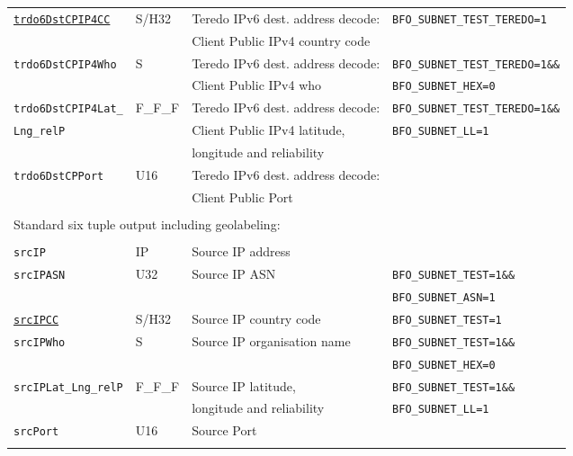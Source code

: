 \documentclass[documentation]{subfiles}
\begin{document}
\begin{longtable}{llll}
    {\tt \hyperref[subnet]{trdo6DstCPIP4CC}}  & S/H32   & Teredo IPv6 dest. address decode:       & {\tt\small BFO\_SUBNET\_TEST\_TEREDO=1}\\
                                              &         & \qquad Client Public IPv4 country code  & \\
    {\tt trdo6DstCPIP4Who}                    & S       & Teredo IPv6 dest. address decode:       & {\tt\small BFO\_SUBNET\_TEST\_TEREDO=1\&\&}\\
                                              &         & \qquad Client Public IPv4 who           & {\tt\small BFO\_SUBNET\_HEX=0}\\
    {\tt trdo6DstCPIP4Lat\_}                  & F\_F\_F & Teredo IPv6 dest. address decode:       & {\tt\small BFO\_SUBNET\_TEST\_TEREDO=1\&\&}\\
    {\tt \qquad Lng\_relP}                    &         & \qquad Client Public IPv4 latitude,     & {\tt\small BFO\_SUBNET\_LL=1}\\
                                              &         & \qquad\qquad longitude and reliability  & \\
    {\tt trdo6DstCPPort}                      & U16     & Teredo IPv6 dest. address decode:       & \\
                                              &         & \qquad Client Public Port               & \\\\

    \multicolumn{4}{l}{Standard six tuple output including geolabeling:}\\\\

    {\tt srcIP}                      & IP      & Source IP address                & \\
    {\tt srcIPASN}                   & U32     & Source IP ASN                    & {\tt\small BFO\_SUBNET\_TEST=1\&\&}\\
                                     &         &                                  & {\tt\small BFO\_SUBNET\_ASN=1}\\
    {\tt \hyperref[subnet]{srcIPCC}} & S/H32   & Source IP country code           & {\tt\small BFO\_SUBNET\_TEST=1}\\
    {\tt srcIPWho}                   & S       & Source IP organisation name      & {\tt\small BFO\_SUBNET\_TEST=1\&\&}\\
                                     &         &                                  & {\tt\small BFO\_SUBNET\_HEX=0}\\
    {\tt srcIPLat\_Lng\_relP}        & F\_F\_F & Source IP latitude,              & {\tt\small BFO\_SUBNET\_TEST=1\&\&}\\
                                     &         & \qquad longitude and reliability & {\tt\small BFO\_SUBNET\_LL=1}\\
    {\tt srcPort}                    & U16     & Source Port                      & \\\\


\end{longtable}
\end{document}
